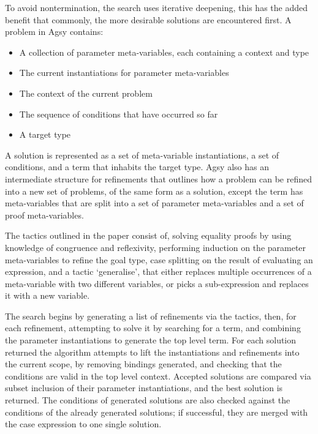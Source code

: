 \documentclass[a4paper]{article}
\begin{document}
To avoid nontermination, the search uses iterative deepening, this has the added benefit that commonly, the
more desirable solutions are encountered first. A problem in Agsy contains:
\begin{itemize}
\item A collection of parameter meta-variables, each containing a context and type
\item The current instantiations for parameter meta-variables
\item The context of the current problem
\item The sequence of conditions that have occurred so far
\item A target type
\end{itemize}

A solution is represented as a set of meta-variable instantiations, a set of conditions, and a term that inhabits the
target type. Agsy also has an intermediate structure for refinements that outlines how a problem can be refined into a new set
of problems, of the same form as a solution, except the term has meta-variables that are split into a set of
parameter meta-variables and a set of proof meta-variables.

The tactics outlined in the paper consist of, solving equality proofs by using knowledge of congruence and reflexivity, 
performing induction on the parameter meta-variables to refine the goal type, case splitting on the result of evaluating 
an expression, and a tactic `generalise', that either replaces multiple occurrences of a meta-variable with two different 
variables, or picks a sub-expression and replaces it with a new variable. 

The search begins by generating a list of refinements via the tactics, then, for each refinement, attempting to solve it by
searching for a term, and combining the parameter instantiations to generate the top level term. For each solution returned the algorithm attempts to lift the instantiations and refinements into 
the current scope, by removing bindings generated, and checking that the conditions are valid in the top level context. Accepted solutions are compared via subset inclusion of their parameter instantiations, and the best solution is returned. The conditions
of generated solutions are also checked against the conditions of the already generated solutions; if successful,
they are merged with the case expression to one single solution. 
\end{document}
